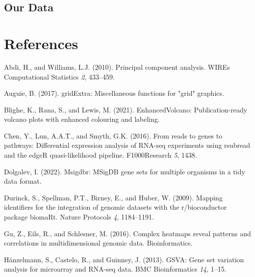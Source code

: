 \documentclass[
  parskip,
  oneside]{scrreprt}
\newlength{\cslhangindent}
\newlength{\cslentryspacingunit} %
\newenvironment{CSLReferences}[2] %
 {%
  \setlength{\parindent}{0pt}
  \ifodd #1
  \let\oldpar\par
  \def\par{\hangindent=\cslhangindent\oldpar}
  \fi
  \setlength{\parskip}{#2\cslentryspacingunit}
 }%
 {}
\begin{document}
\hypertarget{our-data}{%
\section{Our Data}\label{our-data}}

\tableofcontents

\hypertarget{references}{%
\chapter{References}\label{references}}

\hypertarget{refs}{}
\begin{CSLReferences}{0}{0}
\leavevmode{}%
Abdi, H., and Williams, L.J. (2010). Principal component analysis. WIREs
Computational Statistics \emph{2}, 433--459.

\leavevmode{}%
Auguie, B. (2017). gridExtra: Miscellaneous functions for "grid"
graphics.

\leavevmode{}%
Blighe, K., Rana, S., and Lewis, M. (2021). EnhancedVolcano:
Publication-ready volcano plots with enhanced colouring and labeling.

\leavevmode{}%
Chen, Y., Lun, A.A.T., and Smyth, G.K. (2016). From reads to genes to
pathways: Differential expression analysis of RNA-seq experiments using
rsubread and the edgeR quasi-likelihood pipeline. F1000Research
\emph{5}, 1438.

\leavevmode{}%
Dolgalev, I. (2022). Msigdbr: MSigDB gene sets for multiple organisms in
a tidy data format.

\leavevmode{}%
Durinck, S., Spellman, P.T., Birney, E., and Huber, W. (2009). Mapping
identifiers for the integration of genomic datasets with the
r/bioconductor package biomaRt. Nature Protocols \emph{4}, 1184--1191.

\leavevmode{}%
Gu, Z., Eils, R., and Schlesner, M. (2016). Complex heatmaps reveal
patterns and correlations in multidimensional genomic data.
Bioinformatics.

\leavevmode{}%
Hänzelmann, S., Castelo, R., and Guinney, J. (2013). GSVA: Gene set
variation analysis for microarray and RNA-seq data. BMC Bioinformatics
\emph{14}, 1--15.


\end{CSLReferences}
\end{document}
